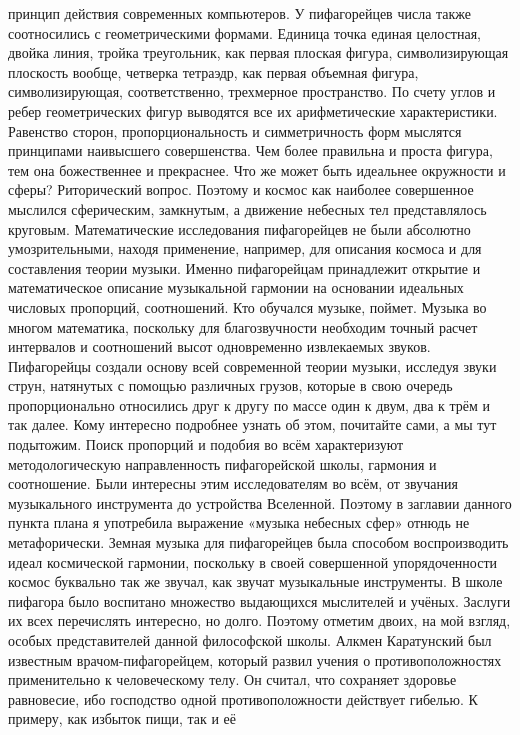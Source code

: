 принцип действия современных компьютеров. У пифагорейцев числа также
соотносились с геометрическими формами. Единица точка единая целостная, двойка
линия, тройка треугольник, как первая плоская фигура, символизирующая плоскость
вообще, четверка тетраэдр, как первая объемная фигура, символизирующая,
соответственно, трехмерное пространство. По счету углов и ребер геометрических
фигур выводятся все их арифметические характеристики. Равенство сторон,
пропорциональность и симметричность форм мыслятся принципами наивысшего
совершенства. Чем более правильна и проста фигура, тем она божественнее и
прекраснее. Что же может быть идеальнее окружности и сферы? Риторический вопрос.
Поэтому и космос как наиболее совершенное мыслился сферическим, замкнутым, а
движение небесных тел представлялось круговым. Математические исследования
пифагорейцев не были абсолютно умозрительными, находя применение, например, для
описания космоса и для составления теории музыки. Именно пифагорейцам
принадлежит открытие и математическое описание музыкальной гармонии на основании
идеальных числовых пропорций, соотношений. Кто обучался музыке, поймет. Музыка
во многом математика, поскольку для благозвучности необходим точный расчет
интервалов и соотношений высот одновременно извлекаемых звуков. Пифагорейцы
создали основу всей современной теории музыки, исследуя звуки струн, натянутых с
помощью различных грузов, которые в свою очередь пропорционально относились друг
к другу по массе один к двум, два к трём и так далее. Кому интересно подробнее
узнать об этом, почитайте сами, а мы тут подытожим. Поиск пропорций и подобия во
всём характеризуют методологическую направленность пифагорейской школы, гармония
и соотношение. Были интересны этим исследователям во всём, от звучания
музыкального инструмента до устройства Вселенной. Поэтому в заглавии данного
пункта плана я употребила выражение «музыка небесных сфер» отнюдь не
метафорически. Земная музыка для пифагорейцев была способом воспроизводить идеал
космической гармонии, поскольку в своей совершенной упорядоченности космос
буквально так же звучал, как звучат музыкальные инструменты. В школе пифагора
было воспитано множество выдающихся мыслителей и учёных. Заслуги их всех
перечислять интересно, но долго. Поэтому отметим двоих, на мой взгляд, особых
представителей данной философской школы. Алкмен Каратунский был известным
врачом-пифагорейцем, который развил учения о противоположностях применительно к
человеческому телу. Он считал, что сохраняет здоровье равновесие, ибо господство
одной противоположности действует гибелью. К примеру, как избыток пищи, так и её
